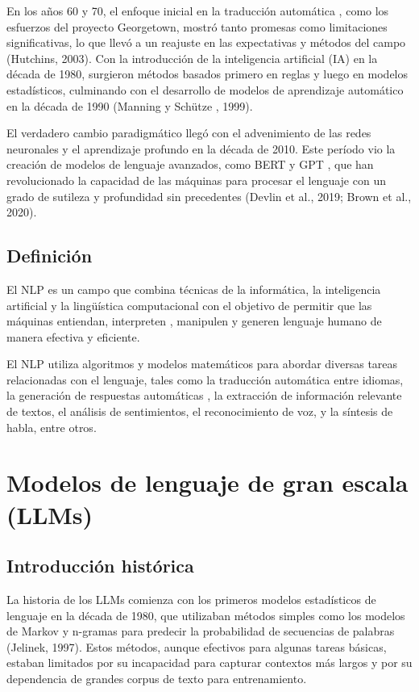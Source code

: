 En los años 60 y 70, el enfoque inicial en la traducción automática
, como los esfuerzos del proyecto Georgetown, mostró tanto promesas como limitaciones significativas, lo que llevó a un
reajuste en las expectativas y métodos del campo (Hutchins, 2003). Con la introducción de la inteligencia
artificial (IA) en la década de 1980, surgieron métodos basados primero en reglas y luego en modelos
estadísticos, culminando con el desarrollo de modelos de aprendizaje automático en la década de 1990 (Manning y Schütze
, 1999).

El verdadero cambio paradigmático llegó con el advenimiento de las redes neuronales y el aprendizaje profundo
en la década de 2010. Este período vio la creación de modelos de lenguaje avanzados, como BERT y GPT
, que han revolucionado la capacidad de las máquinas para procesar el lenguaje con un grado de sutileza y profundidad
sin precedentes (Devlin et al., 2019; Brown et al., 2020).

\subsection*{Definición}
El NLP es un campo que combina técnicas de la informática, la inteligencia artificial y la lingüística computacional con
el objetivo de permitir que las máquinas entiendan, interpreten
, manipulen y generen lenguaje humano de manera efectiva y eficiente.

El NLP utiliza algoritmos y modelos matemáticos para abordar diversas tareas relacionadas con el lenguaje, tales como la
traducción automática entre idiomas, la generación de respuestas automáticas
, la extracción de información relevante de textos, el análisis de sentimientos, el reconocimiento de voz, y
la síntesis de habla, entre otros.


\section{Modelos de lenguaje de gran escala (LLMs)}
\subsection*{Introducción histórica}
La historia de los LLMs comienza con los primeros modelos estadísticos de lenguaje en
la década de 1980, que utilizaban métodos simples como los modelos de Markov y n-gramas para predecir la probabilidad
de secuencias de palabras (Jelinek, 1997). Estos métodos, aunque efectivos para algunas tareas básicas,
estaban limitados por su incapacidad para capturar contextos más largos
y por su dependencia de grandes corpus de texto para entrenamiento.

